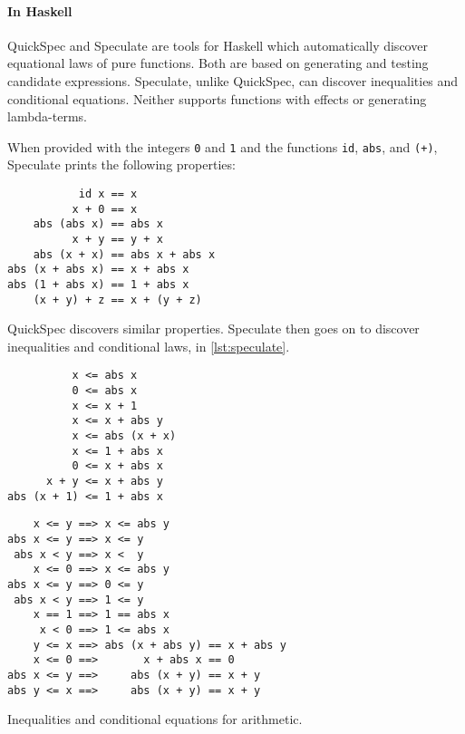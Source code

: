 \paragraph{In Haskell}
QuickSpec\cite{claessen2010,smallbone2017} and
Speculate\cite{braquehais2017} are tools for Haskell which
automatically discover equational laws of pure functions.  Both are
based on generating and testing candidate expressions.  Speculate,
unlike QuickSpec, can discover inequalities and conditional equations.
Neither supports functions with effects or generating lambda-terms.

When provided with the integers \verb|0| and \verb|1| and the
functions \verb|id|, \verb|abs|, and \verb|(+)|, Speculate prints the
following properties:

\begin{verbatim}
           id x == x
          x + 0 == x
    abs (abs x) == abs x
          x + y == y + x
    abs (x + x) == abs x + abs x
abs (x + abs x) == x + abs x
abs (1 + abs x) == 1 + abs x
    (x + y) + z == x + (y + z)
\end{verbatim}

QuickSpec discovers similar properties.  Speculate then goes on to
discover inequalities and conditional laws, in \cref{lst:speculate}.

\begin{listing}
\begin{minipage}[t]{0.45\textwidth}
\begin{verbatim}
          x <= abs x
          0 <= abs x
          x <= x + 1
          x <= x + abs y
          x <= abs (x + x)
          x <= 1 + abs x
          0 <= x + abs x
      x + y <= x + abs y
abs (x + 1) <= 1 + abs x
\end{verbatim}
\end{minipage}
\begin{minipage}[t]{0.55\textwidth}
\begin{verbatim}
    x <= y ==> x <= abs y
abs x <= y ==> x <= y
 abs x < y ==> x <  y
    x <= 0 ==> x <= abs y
abs x <= y ==> 0 <= y
 abs x < y ==> 1 <= y
    x == 1 ==> 1 == abs x
     x < 0 ==> 1 <= abs x
    y <= x ==> abs (x + abs y) == x + abs y
    x <= 0 ==>       x + abs x == 0
abs x <= y ==>     abs (x + y) == x + y
abs y <= x ==>     abs (x + y) == x + y
\end{verbatim}
\end{minipage}
\caption{Inequalities and conditional equations for arithmetic.}\label{lst:speculate}
\end{listing}

